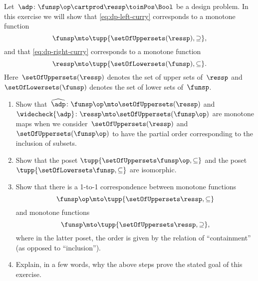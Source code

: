 \begin{gradedexercise}
    \label{ex:CurryingDesignProblems}
    Let~$\adp\colon \funsp\op \cartprod \ressp\toinPos \Bool$ be a design problem.
    In this exercise we will show that \cref{eq:dp-left-curry} corresponds to a monotone function
    \begin{equation}
        \funsp \mto \tupp{\setOfUppersets (\ressp), \supseteq},
    \end{equation}
    and that \cref{eq:dp-right-curry} corresponds to a monotone function
    \begin{equation}
        \ressp \mto \tupp{\setOfLowersets(\funsp), \subseteq}.
    \end{equation}
    Here~$\setOfUppersets (\ressp)$ denotes the set of upper sets of~$\ressp$ and~$\setOfLowersets(\funsp)$ denotes the set of lower sets of~$\funsp$.

    \begin{enumerate}
        \item Show that~$\widehat{\adp} \colon \funsp\op \mto \setOfUppersets (\ressp)$ and~$\widecheck{\adp} \colon \ressp \mto \setOfUppersets (\funsp\op)$ are monotone maps when we consider~$\setOfUppersets (\ressp)$ and~$\setOfUppersets (\funsp\op)$ to have the partial order corresponding to the inclusion of subsets.
        \item Show that the poset $\tupp{\setOfUppersets\funsp\op, \subseteq}$ and the poset $\tupp{\setOfLowersets\funsp, \subseteq}$ are isomorphic.
        \item Show that there is a 1-to-1 correspondence between monotone functions
              \begin{equation}
                  \funsp\op \mto \tupp{\setOfUppersets \ressp, \subseteq}
              \end{equation}
              and monotone functions
              \begin{equation}
                  \funsp \mto \tupp{\setOfUppersets \ressp, \supseteq},
              \end{equation}
              where in the latter poset, the order is given by the relation of ``containment'' (as opposed to ``inclusion'').
        \item Explain, in a few words, why the above steps prove the stated goal of this exercise.
    \end{enumerate}
\end{gradedexercise}

